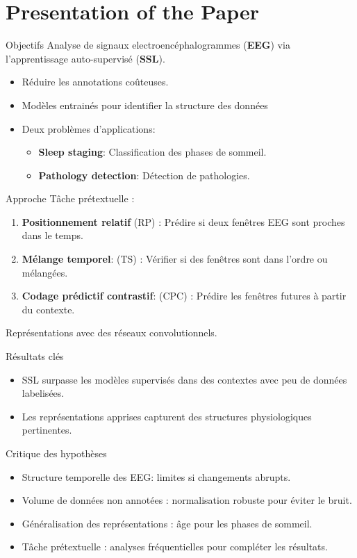 \section{Presentation of the Paper}

\begin{frame}{Objectifs}
Analyse de signaux electroencéphalogrammes (\textbf{EEG}) via l'apprentissage auto-supervisé (\textbf{SSL}).
\begin{itemize}
    \item Réduire les annotations coûteuses.
    \item Modèles entrainés pour identifier la structure des données
    \item Deux problèmes d'applications:
    \begin{itemize}
        \item \textbf{Sleep staging}: Classification des phases de sommeil.
        \item \textbf{Pathology detection}: Détection de pathologies.
    \end{itemize}
    \end{itemize}
\end{frame}

\begin{frame}{Approche}
Tâche prétextuelle :
    \begin{enumerate}
        \item \textbf{Positionnement relatif} (RP) : Prédire si deux fenêtres EEG sont proches dans le temps.
        \item \textbf{Mélange temporel}: (TS) : Vérifier si des fenêtres sont dans l’ordre ou mélangées.
        \item \textbf{Codage prédictif contrastif}: (CPC) : Prédire les fenêtres futures à partir du contexte.
    \end{enumerate}
Représentations avec des réseaux convolutionnels.
\end{frame}

\begin{frame}{Résultats clés}
\begin{itemize}
    \item SSL surpasse les modèles supervisés dans des contextes avec peu de données labelisées.
    \item Les représentations apprises capturent des structures physiologiques pertinentes.
\end{itemize}
\end{frame}

\begin{frame}{Critique des hypothèses}
\begin{itemize}
    \item Structure temporelle des EEG: limites si changements abrupts.
    \item Volume de données non annotées : normalisation robuste pour éviter le bruit.
    \item Généralisation des représentations : âge pour les phases de sommeil.
    \item Tâche prétextuelle : analyses fréquentielles pour compléter les résultats.
\end{itemize}
\end{frame}


